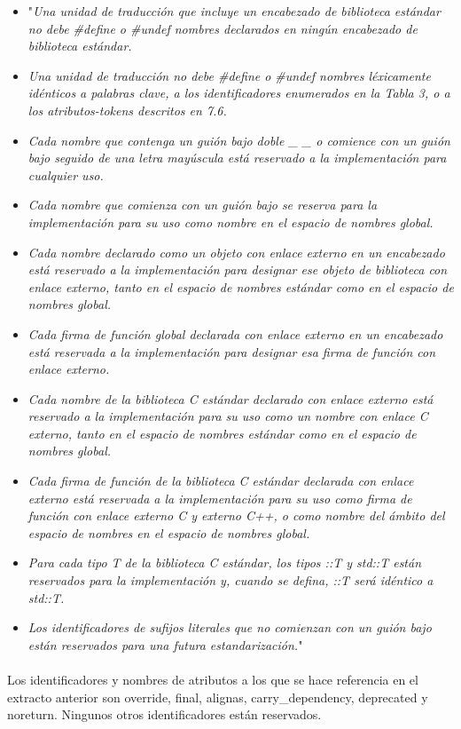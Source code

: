 			\begin{itemize}
				\item "\textit{Una unidad de traducción que incluye un encabezado de biblioteca estándar no debe \#define o \#undef nombres declarados en ningún encabezado de biblioteca estándar.}
				\item \textit{Una unidad de traducción no debe \#define o \#undef nombres léxicamente idénticos a palabras clave, a los identificadores enumerados en la Tabla 3, o a los atributos-tokens descritos en 7.6.}
				\item \textit{Cada nombre que contenga un guión bajo doble \_ \_ o comience con un guión bajo seguido de una letra mayúscula está reservado a la implementación para cualquier uso.}
				\item \textit{Cada nombre que comienza con un guión bajo se reserva para la implementación para su uso como nombre en el espacio de nombres global.}
				\item \textit{Cada nombre declarado como un objeto con enlace externo en un encabezado está reservado a la implementación para designar ese objeto de biblioteca con enlace externo, tanto en el espacio de nombres estándar como en el espacio de nombres global.}
				\item \textit{Cada firma de función global declarada con enlace externo en un encabezado está reservada a la implementación para designar esa firma de función con enlace externo.}
				\item \textit{Cada nombre de la biblioteca C estándar declarado con enlace externo está reservado a la implementación para su uso como un nombre con enlace C externo, tanto en el espacio de nombres estándar como en el espacio de nombres global.}
				\item \textit{Cada firma de función de la biblioteca C estándar declarada con enlace externo está reservada a la implementación para su uso como firma de función con enlace externo C y externo C++, o como nombre del ámbito del espacio de nombres en el espacio de nombres global.}
				\item \textit{Para cada tipo T de la biblioteca C estándar, los tipos ::T y std::T están reservados para la implementación y, cuando se defina, ::T será idéntico a std::T.}
				\item \textit{Los identificadores de sufijos literales que no comienzan con un guión bajo están reservados para una futura estandarización.}"
			\end{itemize}
		
			\paragraph{}Los identificadores y nombres de atributos a los que se hace referencia en el extracto anterior son override, final, alignas, carry\_dependency, deprecated y noreturn. Ningunos otros identificadores están reservados.
			
